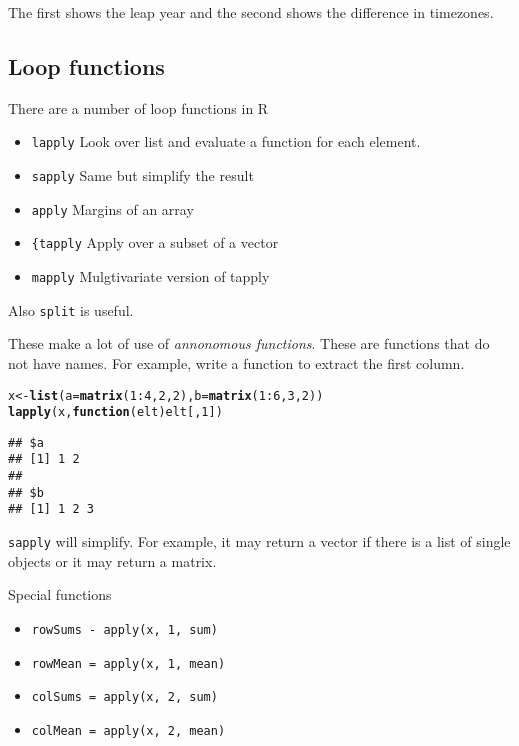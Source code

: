 \documentclass[12pt, a4paper, oneside]{article}\usepackage[]{graphicx}\usepackage[]{color}
\makeatletter
\newcommand{\hlnum}[1]{\textcolor[rgb]{0.686,0.059,0.569}{#1}}%
\newcommand{\hlopt}[1]{\textcolor[rgb]{0,0,0}{#1}}%
\newcommand{\hlstd}[1]{\textcolor[rgb]{0.345,0.345,0.345}{#1}}%
\newcommand{\hlkwa}[1]{\textcolor[rgb]{0.161,0.373,0.58}{\textbf{#1}}}%
\newcommand{\hlkwb}[1]{\textcolor[rgb]{0.69,0.353,0.396}{#1}}%
\newcommand{\hlkwc}[1]{\textcolor[rgb]{0.333,0.667,0.333}{#1}}%
\newcommand{\hlkwd}[1]{\textcolor[rgb]{0.737,0.353,0.396}{\textbf{#1}}}%
\newenvironment{kframe}{%
 \def\at@end@of@kframe{}%
 \ifinner\ifhmode%
  \def\at@end@of@kframe{\end{minipage}}%
  \begin{minipage}{\columnwidth}%
 \fi\fi%
 \def\FrameCommand##1{\hskip\@totalleftmargin \hskip-\fboxsep
 \colorbox{shadecolor}{##1}\hskip-\fboxsep
     \hskip-\linewidth \hskip-\@totalleftmargin \hskip\columnwidth}%
 \MakeFramed {\advance\hsize-\width
   \@totalleftmargin\z@ \linewidth\hsize
   \@setminipage}}%
 {\par\unskip\endMakeFramed%
 \at@end@of@kframe}
\newenvironment{knitrout}{}{} %
\makeatother
\begin{document}
The first shows the leap year and the second shows the difference in timezones. 
\subsection{Loop functions}
There are a number of loop functions in R
\begin{itemize}
\item \lstinline{lapply} Look over list and evaluate a function for each element.
\item \lstinline{sapply} Same but simplify the result
\item \lstinline{apply} Margins of an array
\item \lstinline{{tapply} Apply over a subset of a vector
\item \lstinline{mapply} Mulgtivariate version of tapply
\end{itemize}

Also \lstinline{split} is useful. 

These make a lot of use of \emph{annonomous functions}.  These are functions that do not have names. For example, write a function to extract the first column.
\begin{knitrout}
\color{fgcolor}\begin{kframe}
\begin{alltt}
\hlstd{x} \hlkwb{<-} \hlkwd{list}\hlstd{(}\hlkwc{a} \hlstd{=} \hlkwd{matrix}\hlstd{(}\hlnum{1}\hlopt{:}\hlnum{4}\hlstd{,} \hlnum{2}\hlstd{,} \hlnum{2}\hlstd{),} \hlkwc{b} \hlstd{=} \hlkwd{matrix}\hlstd{(}\hlnum{1}\hlopt{:}\hlnum{6}\hlstd{,} \hlnum{3}\hlstd{,} \hlnum{2}\hlstd{))}
\hlkwd{lapply}\hlstd{(x,} \hlkwa{function}\hlstd{(}\hlkwc{elt}\hlstd{) elt[,} \hlnum{1}\hlstd{])}
\end{alltt}
\begin{verbatim}
## $a
## [1] 1 2
## 
## $b
## [1] 1 2 3
\end{verbatim}
\end{kframe}
\end{knitrout}

\lstinline{sapply} will simplify.  For example, it may return a vector if there is a list of single objects or it may return a matrix. 

Special functions
\begin{itemize}
\item \lstinline{rowSums - apply(x, 1, sum)}
\item \lstinline{rowMean = apply(x, 1, mean)}
\item \lstinline{colSums = apply(x, 2, sum)}
\item \lstinline{colMean = apply(x, 2, mean)}
\end{itemize}
\end{document}
